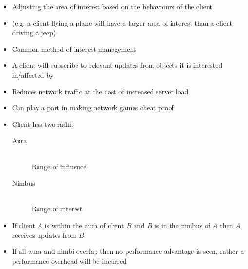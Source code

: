 \documentclass[a4paper]{article}
\begin{document}

\begin{itemize}
  \item
    Adjusting the area of interest based on the behaviours of the client

  \item
    (e.g. a client flying a plane will have a larger area of interest than a
    client driving a jeep)

\end{itemize}


\begin{itemize}
  \item
    Common method of interest management

  \item
    A client will subscribe to relevant updates from objects it is interested
    in/affected by

  \item
    Reduces network traffic at the cost of increased server load

  \item
    Can play a part in making network games cheat proof

\end{itemize}


\begin{itemize}
  \item
    Client has two radii:
    \begin{description}
      \item[Aura] \hfill \\
        Range of influence

      \item[Nimbus] \hfill \\
        Range of interest

    \end{description}

  \item
    If client $A$ is within the aura of client $B$ and $B$ is in the nimbus of
    $A$ then $A$ receives updates from $B$

  \item
    If all aura and nimbi overlap then no performance advantage is seen, rather
    a performance overhead will be incurred

\end{itemize}
\end{document}
